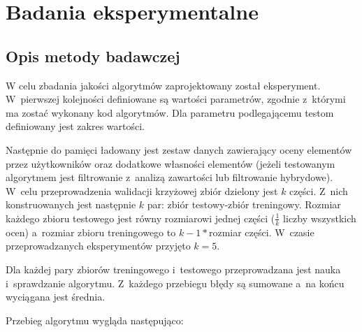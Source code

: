 \documentclass[twoside]{iisthesis}
\begin{document}
\chapter{Badania eksperymentalne}
	\section{Opis metody badawczej}
	
		W celu zbadania jakości algorytmów zaprojektowany został eksperyment. W~pierwszej kolejności definiowane są wartości parametrów, zgodnie z~którymi ma zostać wykonany kod algorytmów. 
		Dla parametru podlegającemu testom definiowany jest zakres wartości. 
		
		Następnie do pamięci ładowany jest zestaw danych zawierający oceny elementów przez użytkowników oraz dodatkowe własności elementów (jeżeli testowanym algorytmem jest filtrowanie z~analizą zawartości lub filtrowanie hybrydowe). W~celu przeprowadzenia walidacji krzyżowej zbiór dzielony jest $k$ części. Z~nich konstruowanych jest następnie $k$ par: zbiór testowy-zbiór treningowy. Rozmiar każdego zbioru testowego jest równy rozmiarowi jednej części ($\frac{1}{k}$ liczby wszystkich ocen) a~rozmiar zbioru treningowego to $k-1*$rozmiar części. W~czasie przeprowadzanych eksperymentów przyjęto $k=5$.
		
		Dla każdej pary zbiorów treningowego i~testowego przeprowadzana jest nauka i~sprawdzanie algorytmu. Z~każdego przebiegu błędy są sumowane a~na końcu wyciągana jest średnia.
		
		Przebieg algorytmu wygląda następująco:
		
\end{document}
